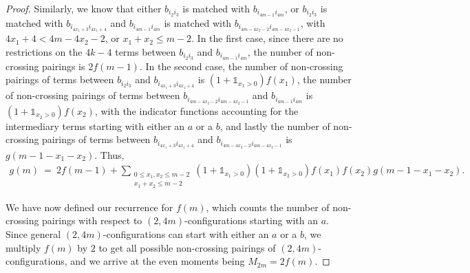 \documentclass[11pt,reqno]{amsart}
\numberwithin{equation}{section}
\theoremstyle{plain}
\begin{document}
\begin{proof}
Similarly, we know that either $b_{i_2 i_3}$ is matched with $b_{i_{4m-1}i_{4m}}$, or $b_{i_2 i_3}$ is matched with $b_{i_{4x_1+3}i_{4x_1+4}}$ and $b_{i_{4m-1}i_{4m}}$ is matched with $b_{i_{4m-4x_2-2}i_{4m-4x_2-1}}$, with $4x_1+4<4m-4x_2-2$, or $x_1+x_2\leq m-2$. In the first case, since there are no restrictions on the $4k-4$ terms between $b_{i_2 i_3}$ and $b_{i_{4m-1}i_{4m}}$, the number of non-crossing pairings is $2f(m-1)$. In the second case, the number of non-crossing pairings of terms between $b_{i_2 i_3}$ and $b_{i_{4x_1+3}i_{4x_1+4}}$ is $(1+\mathbb{1}_{x_1>0})f(x_1)$, the number of non-crossing pairings of terms between $b_{i_{4m-4x_2-2}i_{4m-4x_2-1}}$ and $b_{i_{4m-1}i_{4m}}$ is $(1+\mathbb{1}_{x_2>0})f(x_2)$, with the indicator functions accounting for the intermediary terms starting with either an $a$ or a $b$, and lastly the number of non-crossing pairings of terms between $b_{i_{4x_1+3}i_{4x_1+4}}$ and $b_{i_{4m-4x_2-2}i_{4m-4x_2-1}}$ is $g(m-1-x_1-x_2)$. Thus, %
\begin{align}
    g(m) \ = \ 2f(m-1) + \sum_{\substack{0\leq x_1,x_2\leq m-2\\ x_1+x_2\leq m-2}}(1+\mathbb{1}_{x_1>0})(1+\mathbb{1}_{x_2>0})f(x_1)f(x_2)g(m-1-x_1-x_2).
\end{align}


We have now defined our recurrence for $f(m)$, which counts the number of non-crossing pairings with respect to $(2, 4m)$-configurations starting with an $a$. Since general $(2, 4m)$-configurations can start with either an $a$ or a $b$, we multiply $f(m)$ by $2$ to get all possible non-crossing pairings of $(2, 4m)$-configurations, and we arrive at the even moments being $M_{2m}=2f(m)$.
\end{proof} 
\end{document}
